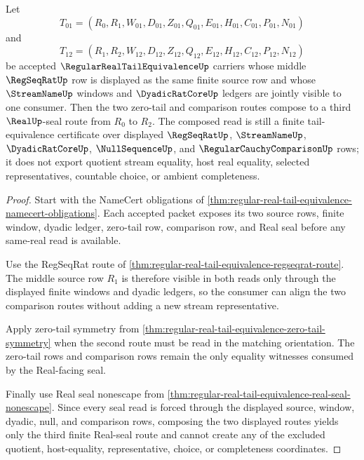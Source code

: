 \begin{theorem}
\label{thm:regular-real-tail-equivalence-transitivity-route}
Let
$$
T_{01}=(R_0,R_1,W_{01},D_{01},Z_{01},Q_{01},E_{01},H_{01},C_{01},P_{01},N_{01})
$$
and
$$
T_{12}=(R_1,R_2,W_{12},D_{12},Z_{12},Q_{12},E_{12},H_{12},C_{12},P_{12},N_{12})
$$
be accepted $\RegularRealTailEquivalenceUp$ carriers whose middle $\RegSeqRatUp$ row is displayed as the same finite source row and whose $\StreamNameUp$ windows and $\DyadicRatCoreUp$ ledgers are jointly visible to one consumer. Then the two zero-tail and comparison routes compose to a third $\RealUp$-seal route from $R_0$ to $R_2$. The composed read is still a finite tail-equivalence certificate over displayed $\RegSeqRatUp$, $\StreamNameUp$, $\DyadicRatCoreUp$, $\NullSequenceUp$, and $\RegularCauchyComparisonUp$ rows; it does not export quotient stream equality, host real equality, selected representatives, countable choice, or ambient completeness.
\end{theorem}
\begin{proof}
Start with the NameCert obligations of \autoref{thm:regular-real-tail-equivalence-namecert-obligations}. Each accepted packet exposes its two source rows, finite window, dyadic ledger, zero-tail row, comparison row, and Real seal before any same-real read is available.

Use the RegSeqRat route of \autoref{thm:regular-real-tail-equivalence-regseqrat-route}. The middle source row $R_1$ is therefore visible in both reads only through the displayed finite windows and dyadic ledgers, so the consumer can align the two comparison routes without adding a new stream representative.

Apply zero-tail symmetry from \autoref{thm:regular-real-tail-equivalence-zero-tail-symmetry} when the second route must be read in the matching orientation. The zero-tail rows and comparison rows remain the only equality witnesses consumed by the Real-facing seal.

Finally use Real seal nonescape from \autoref{thm:regular-real-tail-equivalence-real-seal-nonescape}. Since every seal read is forced through the displayed source, window, dyadic, null, and comparison rows, composing the two displayed routes yields only the third finite Real-seal route and cannot create any of the excluded quotient, host-equality, representative, choice, or completeness coordinates.
\end{proof}

